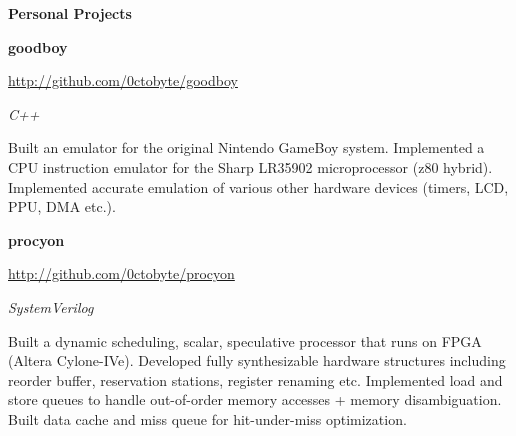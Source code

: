 \documentclass{article}
\newenvironment{name}{\fontfamily{phv}\selectfont\bfseries\normalsize}{\par}
\newenvironment{colorheading}{\fontfamily{phv}\selectfont\bfseries\normalsize\color{darkcyan}}{\par}
\newenvironment{genericbody}{\fontfamily{phv}\selectfont\small\raggedright}{\par}
\newenvironment{metadata}{\fontfamily{phv}\selectfont\itshape\small\color{darkgray}}{\par}
\newenvironment{itemizedbody}{\fontfamily{phv}\selectfont\small\begin{itemize}}{\end{itemize}\par}
\newenvironment{experience}[2]%
{%
  \begin{minipage}{0.6\linewidth}\begin{flushleft}#1\end{flushleft}\end{minipage}%
  \hfill%
  \begin{minipage}{0.3\linewidth}\begin{flushright}#2\end{flushright}\end{minipage}%
}%
{}
\newcommand{\lineitem}{\item[{$\to$}]}
\newcommand{\dotsep}{\begin{centering}\begin{colorheading}{$\bullet$}\end{colorheading}\end{centering}}
\begin{document}
\begin{minipage}[t]{0.6\linewidth}
    \smallskip
    \dotsep
    \smallskip
    \begin{name}Personal Projects\end{name}
    \smallskip
    \begin{experience}
    {
      \begin{colorheading}goodboy\end{colorheading}
      \begin{genericbody}\url{http://github.com/0ctobyte/goodboy}\end{genericbody}
    }
    {
      \begin{metadata}C++\end{metadata}
    }
    \end{experience}
    \par
    \begin{genericbody}
      Built an emulator for the original Nintendo GameBoy system. Implemented a CPU instruction emulator for the Sharp
      LR35902 microprocessor (z80 hybrid). Implemented accurate emulation of various other hardware devices (timers,
      LCD, PPU, DMA etc.).
    \end{genericbody}
    \medskip
    \begin{experience}
    {
      \begin{colorheading}procyon\end{colorheading}
      \begin{genericbody}\url{http://github.com/0ctobyte/procyon}\end{genericbody}
    }
    {
      \begin{metadata}SystemVerilog\end{metadata}
    }
    \end{experience}
    \par
    \begin{genericbody}
      Built a dynamic scheduling, scalar, speculative processor that runs on FPGA (Altera Cylone-IVe). Developed fully
      synthesizable hardware structures including reorder buffer, reservation stations, register renaming etc.
      Implemented load and store queues to handle out-of-order memory accesses + memory disambiguation. Built data
      cache and miss queue for hit-under-miss optimization.
    \end{genericbody}

\end{minipage}
\end{document}
